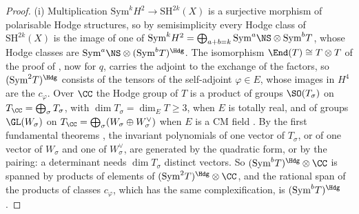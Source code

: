 \begin{proof}
(i) Multiplication $\mathrm{Sym}^{k}H^{2}\to\mathrm{SH}^{2k}(X)$ is a
surjective morphism of polarisable Hodge structures, so by semisimplicity
every Hodge class of $\mathrm{SH}^{2k}(X)$ is the image of one of
$\mathrm{Sym}^{k}H^{2}=\bigoplus_{a+b=k}\mathrm{Sym}^{a}\NS\otimes
\mathrm{Sym}^{b}T$, whose Hodge classes are
$\mathrm{Sym}^{a}\NS\otimes(\mathrm{Sym}^{b}T)^{\Hdg}$. The isomorphism
$\End(T)\cong T\otimes T$ of the proof of , now for $q$,
carries the adjoint to the exchange of the factors, so
$(\mathrm{Sym}^{2}T)^{\Hdg}$ consists of the tensors of the self-adjoint
$\varphi\in E$, whose images in $H^{4}$ are the $c_{\varphi}$. Over $\CC$ the
Hodge group of $T$ is a product of groups $\SO(T_{\sigma})$ on
$T_{\CC}=\bigoplus_{\sigma}T_{\sigma}$, with $\dim T_{\sigma}=\dim_{E}T\ge3$,
when $E$ is totally real, and of groups $\GL(W_{\sigma})$ on
$T_{\CC}=\bigoplus_{\sigma}(W_{\sigma}\oplus W_{\sigma}^{\vee})$ when $E$ is a
CM field \cite{Zar83}. By the first fundamental theorems
\cite[Chapter~5]{GW09}, the invariant polynomials of one vector of
$T_{\sigma}$, or of one vector of $W_{\sigma}$ and one of $W_{\sigma}^{\vee}$,
are generated by the quadratic form, or by the pairing: a determinant needs
$\dim T_{\sigma}$ distinct vectors. So $(\mathrm{Sym}^{b}T)^{\Hdg}\otimes\CC$
is spanned by products of elements of $(\mathrm{Sym}^{2}T)^{\Hdg}\otimes\CC$,
and the rational span of the products of classes $c_{\varphi}$, which has the
same complexification, is $(\mathrm{Sym}^{b}T)^{\Hdg}$.


\end{proof}
